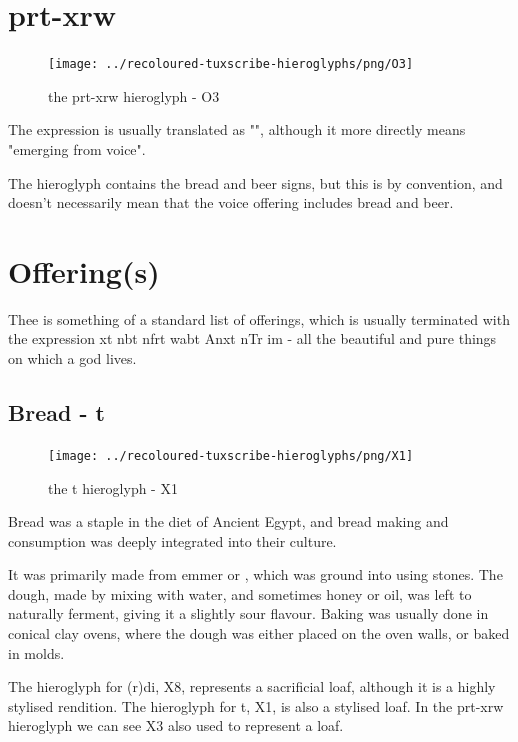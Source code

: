 \section*{prt-xrw}

\begin{figure} [H]
	\centering
	\texttt{[image: ../recoloured-tuxscribe-hieroglyphs/png/O3]}
	\caption{the prt-xrw hieroglyph - O3}
\end{figure}

The expression  is usually translated as "", although it more directly means "emerging from voice".

The hieroglyph contains the bread and beer signs, but this is by convention, and doesn't necessarily mean that the voice offering includes bread and beer.

\section*{Offering(s)}

Thee is something of a standard list of offerings, which is usually terminated with the expression xt nbt nfrt wabt Anxt nTr im - all the beautiful and pure things on which a god lives.

\subsection*{Bread - t}

\begin{figure} [H]
	\centering
	\texttt{[image: ../recoloured-tuxscribe-hieroglyphs/png/X1]}
	\caption{the t hieroglyph - X1}
\end{figure}

Bread was a staple in the diet of Ancient Egypt, and bread making and consumption was deeply integrated into their culture.

It was primarily made from emmer  or , which was ground into  using stones. The dough, made by mixing with water, and sometimes honey or oil, was left to naturally ferment, giving it a slightly sour flavour. Baking was usually done in conical clay ovens, where the dough was either placed on the oven walls, or baked in molds.

The hieroglyph for (r)di, X8, represents a sacrificial loaf, although it is a highly stylised rendition. The hieroglyph for t, X1, is also a stylised loaf. In the prt-xrw hieroglyph we can see X3 also used to represent a loaf.

